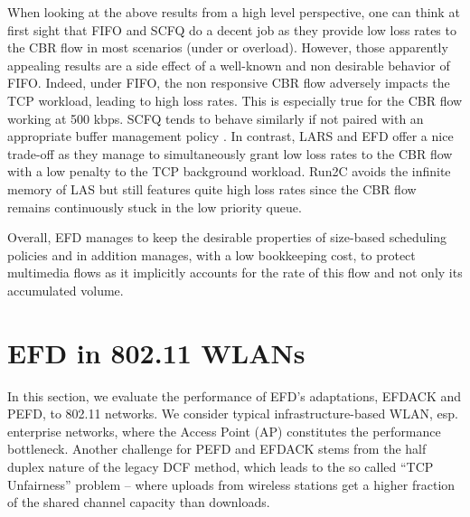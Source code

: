 \documentclass[preprint,12pt]{elsarticle}
\begin{document}
When looking at the above results from a high level perspective, one can think at first sight that FIFO and SCFQ do a decent job as they provide low loss rates to the CBR flow in most scenarios (under or overload). However, those apparently appealing results are a side effect of a well-known and non desirable behavior of FIFO. Indeed, under FIFO, the non responsive CBR flow adversely impacts the TCP workload, leading to high loss rates. This is especially true for the CBR flow working at 500 kbps. SCFQ tends to behave similarly if  not paired with an appropriate buffer management policy \cite{Golestani94SCFQ}. In contrast, LARS and EFD offer a nice trade-off as they manage to simultaneously grant  low loss rates to the CBR flow with a low penalty to the TCP background workload. Run2C avoids the  infinite memory of LAS but still features quite high loss rates since the CBR flow remains continuously stuck in the low priority queue.


Overall, EFD manages to keep the desirable properties of size-based scheduling policies and in addition manages, with a low bookkeeping cost, to protect multimedia flows as it  implicitly accounts for the rate of this flow and not only its accumulated volume. 


\section{EFD in 802.11 WLANs}
\label{sec:perf_wlan}
In this section, we evaluate the performance of EFD's adaptations, EFDACK and PEFD,  to 802.11  networks. %
We consider  typical infrastructure-based WLAN, esp. enterprise networks, where the Access Point (AP) constitutes the performance bottleneck. Another challenge for PEFD and EFDACK stems from the half duplex nature of  the legacy DCF method, which %
leads to the so called ``TCP Unfairness'' \cite{Pilosof03understandingtcp} problem -- where uploads from wireless stations get a higher fraction of the shared channel capacity than downloads. 
\end{document}
